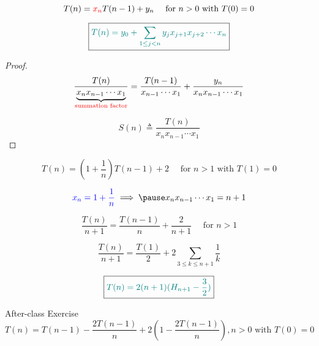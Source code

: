 \begin{frame}{}
  \begin{theorem}
    \[
      T(n) = \textcolor{red}{x_n} T(n-1) + y_n  \quad \text{ for } n > 0 \text{ with } T(0) = 0
    \]

    \[
      \boxed{\textcolor{teal}{T(n) = y_0 + \sum_{1 \le j < n} y_j x_{j+1} x_{j+2} \cdots x_n}}
    \]
  \end{theorem}

  \pause
  \begin{proof}
    \[
      \frac{T(n)}{\underbrace{x_n x_{n-1} \cdots x_1}_{\text{\textcolor{red}{summation factor}}}}
      	= \frac{T(n-1)}{x_{n-1} \cdots x_1} + \frac{y_n}{x_n x_{n-1} \cdots x_1}
    \]

    \pause
    \[
      S(n) \triangleq \frac{T(n)}{x_n x_{n-1} \cdots x_1}
    \]
  \end{proof}
\end{frame}

\begin{frame}{}
  \[
    T(n) = (1 + \frac{1}{n}) T(n-1) + 2  \quad \text{ for } n > 1 \text{ with } T(1) = 0
  \]

  \pause
  \[
    \blue{x_n = 1 + \frac{1}{n}} \implies \pause x_n x_{n-1} \cdots x_1 = n + 1
  \]

  \pause
  \[
    \frac{T(n)}{n+1} = \frac{T(n-1)}{n} + \frac{2}{n+1} \quad \text{ for } n > 1
  \]

  \pause
  \vspace{0.30cm}
  \[
    \frac{T(n)}{n+1} = \frac{T(1)}{2} + 2 \sum_{3 \le k \le n+1} \frac{1}{k}
  \]

  \pause
  \vspace{0.30cm}
  \[
    \boxed{\textcolor{teal}{T(n) = 2(n+1) (H_{n+1} - \frac{3}{2})}}
  \]
\end{frame}

\begin{frame}{}
  \begin{exampleblock}{After-class Exercise}
    \[
      T(n) = T(n-1) - \frac{2T(n-1)}{n} + 2\left(1 - \frac{2T(n-1)}{n}\right), n > 0 \text{ with } T(0) = 0
    \]
  \end{exampleblock}

  \begin{columns}
    \pause
    \pause
  \end{columns}
\end{frame}

